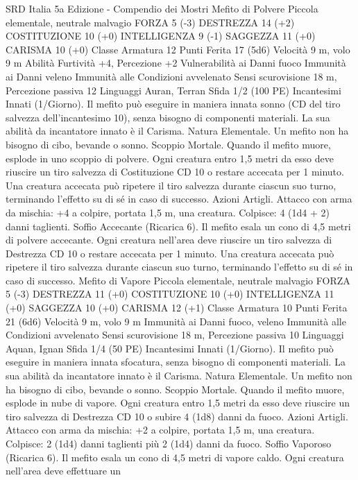 \begin{multicols}{2}
SRD Italia 5a Edizione - Compendio dei Mostri
Mefito di Polvere
Piccola elementale, neutrale malvagio
FORZA 5 (-3)
DESTREZZA 14 (+2)
COSTITUZIONE 10 (+0)
INTELLIGENZA 9 (-1)
SAGGEZZA 11 (+0)
CARISMA 10 (+0)
Classe Armatura 12
Punti Ferita 17 (5d6)
Velocità 9 m, volo 9 m
Abilità Furtività +4, Percezione +2
Vulnerabilità ai Danni fuoco
Immunità ai Danni veleno
Immunità alle Condizioni avvelenato
Sensi scurovisione 18 m, Percezione passiva 12
Linguaggi Auran, Terran
Sfida 1/2 (100 PE)
Incantesimi Innati (1/Giorno). Il mefito può eseguire in maniera
innata sonno (CD del tiro salvezza dell’incantesimo 10), senza
bisogno di componenti materiali. La sua abilità da incantatore
innato è il Carisma.
Natura Elementale. Un mefito non ha bisogno di cibo, bevande
o sonno.
Scoppio Mortale. Quando il mefito muore, esplode in uno
scoppio di polvere. Ogni creatura entro 1,5 metri da esso deve
riuscire un tiro salvezza di Costituzione CD 10 o restare accecata
per 1 minuto. Una creatura accecata può ripetere il tiro salvezza
durante ciascun suo turno, terminando l’effetto su di sé in caso di
successo.
Azioni
Artigli. Attacco con arma da mischia: +4 a colpire, portata 1,5
m, una creatura.
Colpisce: 4 (1d4 + 2) danni taglienti.
Soffio Accecante (Ricarica 6). Il mefito esala un cono di 4,5
metri di polvere accecante. Ogni creatura nell’area deve riuscire
un tiro salvezza di Destrezza CD 10 o restare accecata per 1
minuto. Una creatura accecata può ripetere il tiro salvezza
durante ciascun suo turno, terminando l’effetto su di sé in caso di
successo.
Mefito di Vapore
Piccola elementale, neutrale malvagio
FORZA 5 (-3)
DESTREZZA 11 (+0)
COSTITUZIONE 10 (+0)
INTELLIGENZA 11 (+0)
SAGGEZZA 10 (+0)
CARISMA 12 (+1)
Classe Armatura 10
Punti Ferita 21 (6d6)
Velocità 9 m, volo 9 m
Immunità ai Danni fuoco, veleno
Immunità alle Condizioni avvelenato
Sensi scurovisione 18 m, Percezione passiva 10
Linguaggi Aquan, Ignan
Sfida 1/4 (50 PE)
Incantesimi Innati (1/Giorno). Il mefito può eseguire in maniera
innata sfocatura, senza bisogno di componenti materiali. La sua
abilità da incantatore innato è il Carisma.
Natura Elementale. Un mefito non ha bisogno di cibo, bevande
o sonno.
Scoppio Mortale. Quando il mefito muore, esplode in nube di
vapore. Ogni creatura entro 1,5 metri da esso deve riuscire un
tiro salvezza di Destrezza CD 10 o subire 4 (1d8) danni da fuoco.
Azioni
Artigli. Attacco con arma da mischia: +2 a colpire, portata 1,5
m, una creatura.
Colpisce: 2 (1d4) danni taglienti più 2 (1d4) danni da fuoco.
Soffio Vaporoso (Ricarica 6). Il mefito esala un cono di 4,5
metri di vapore caldo. Ogni creatura nell’area deve effettuare un

\end{multicols}
